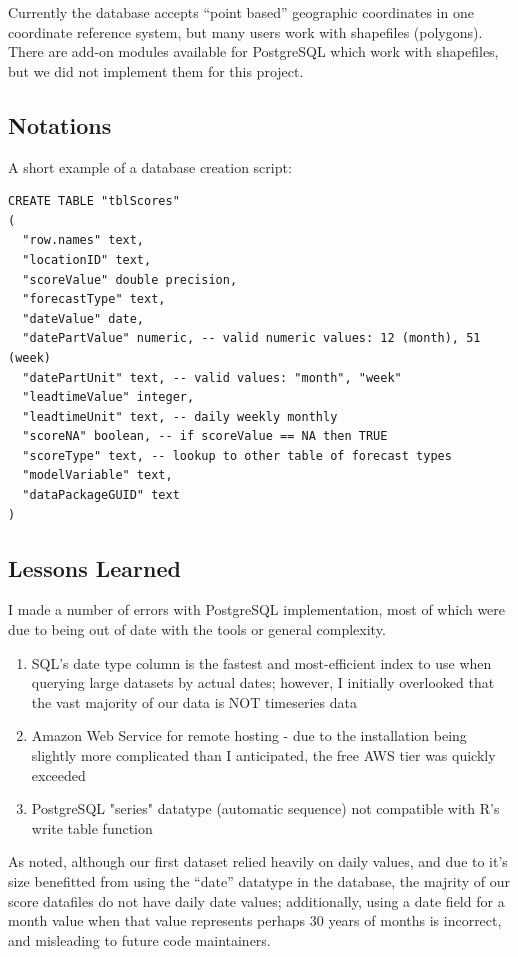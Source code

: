 \documentclass[logos,parttoc,morelanguage=french,morelanguage=german,draft]{orsay-memoire}
\begin{document}
Currently the database accepts ``point based'' geographic coordinates in one coordinate reference system, but many users work with shapefiles (polygons). There are add-on modules available for PostgreSQL which work with shapefiles, but we did not implement them for this project.

\subsection{Notations}

A short example of a database creation script:
\begin{verbatim}
CREATE TABLE "tblScores"
(
  "row.names" text,
  "locationID" text,
  "scoreValue" double precision,
  "forecastType" text,
  "dateValue" date,
  "datePartValue" numeric, -- valid numeric values: 12 (month), 51 (week)
  "datePartUnit" text, -- valid values: "month", "week"
  "leadtimeValue" integer,
  "leadtimeUnit" text, -- daily weekly monthly
  "scoreNA" boolean, -- if scoreValue == NA then TRUE
  "scoreType" text, -- lookup to other table of forecast types
  "modelVariable" text,
  "dataPackageGUID" text
)
\end{verbatim}

\subsection{Lessons Learned}

I made a number of errors with PostgreSQL implementation, most of which were due to being out of date with the tools or general complexity.
%
%

\begin{enumerate}
\item SQL's date type column is the fastest and most-efficient index to use when querying large datasets by actual dates; however, I initially overlooked that the vast majority of our data is NOT timeseries data
\item Amazon Web Service for remote hosting - due to the installation being slightly more complicated than I anticipated, the free AWS tier was quickly exceeded
\item PostgreSQL "series" datatype (automatic sequence) not compatible with R's write table function
\end{enumerate}

As noted, although our first dataset relied heavily on daily values, and due to it's size benefitted from using the ``date'' datatype in the database, the majrity of our score datafiles do not have daily date values; additionally, using a date field for a month value when that value represents perhaps 30 years of months is incorrect, and misleading to future code maintainers.
\end{document}
